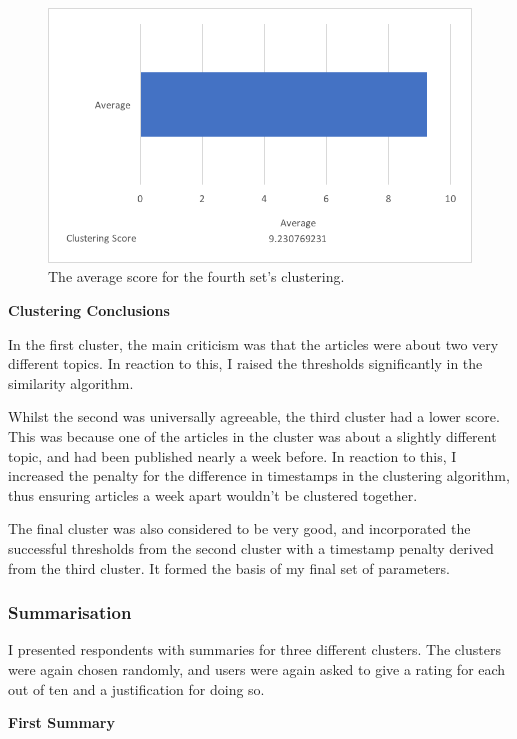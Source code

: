 \documentclass[12pt]{article}
\begin{document}
\begin{figure}[ht!]
  \centering
    \includegraphics[scale=0.7]{cluster4score.png}
   \caption[The average score for a cluster]{The average score for the fourth set's clustering.}
   \label{cluster4}
\end{figure} 

\textbf{Clustering Conclusions}

In the first cluster, the main criticism was that the articles were about two very different topics. In reaction to this, I raised the thresholds significantly in the similarity algorithm. 

Whilst the second was universally agreeable, the third cluster had a lower score. This was because one of the articles in the cluster was about a slightly different topic, and had been published nearly a week before. In reaction to this, I increased the penalty for the difference in timestamps in the clustering algorithm, thus ensuring articles a week apart wouldn't be clustered together.

The final cluster was also considered to be very good, and incorporated the successful thresholds from the second cluster with a timestamp penalty derived from the third cluster. It formed the basis of my final set of parameters.

\subsubsection{Summarisation}

I presented respondents with summaries for three different clusters. The clusters were again chosen randomly, and users were again asked to give a rating for each out of ten and a justification for doing so.

\textbf{First Summary}
\end{document}
